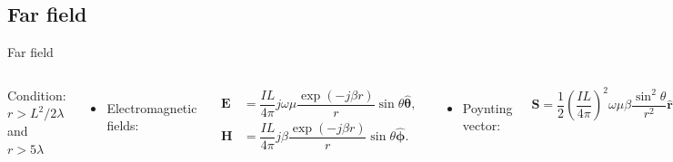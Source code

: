 \subsection{Far field}
\begin{frame}{Far field}
    \begin{columns}
        Condition: \( r > L^2/2\lambda \) and \( r > 5 \lambda \)
        
        \begin{itemize}
            \item Electromagnetic fields:
        \end{itemize}
        \vspace{-2mm}
        \begin{align*}
            \mathbf{E} &= \dfrac{IL}{4 \pi} j \omega \mu \dfrac{ \exp ( - j \beta r) }{r} \sin \theta \mathbf{ \hat{\theta} }, \\
            \mathbf{H} &= \dfrac{IL}{4 \pi} j \beta \dfrac{ \exp ( - j \beta r) }{r} \sin \theta \mathbf{ \hat{\phi} }.
        \end{align*}

        \begin{itemize}
            \item Poynting vector:
        \end{itemize}
        \begin{equation*}
            \mathbf{S} = \dfrac{1}{2} \left( \dfrac{IL}{4 \pi} \right)^2 \omega \mu \beta \dfrac{\sin^2 \theta}{r^2} \mathbf{\hat{r}}.
        \end{equation*}
        

\end{columns}
\end{frame}

